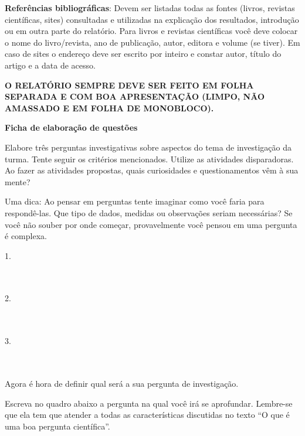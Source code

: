 \noindent\textbf{Referências bibliográficas}: Devem ser listadas todas as fontes (livros, revistas científicas, sites) consultadas e utilizadas na explicação dos resultados, introdução ou em outra parte do relatório. Para livros e revistas científicas você deve colocar o nome do livro/revista, ano de publicação, autor, editora e volume (se tiver). Em caso de sites o endereço deve ser escrito por inteiro e constar autor, título do artigo e a data de acesso.

\noindent\textbf{O RELATÓRIO SEMPRE DEVE SER FEITO EM FOLHA SEPARADA E COM BOA APRESENTAÇÃO (LIMPO, NÃO AMASSADO E EM FOLHA DE MONOBLOCO).}

\cleardoublepage

\label{elaboracao-questoes}
\centering
\textbf{\Large\color{\currentcolor}Ficha de elaboração de questões}
\justify

Elabore três perguntas investigativas sobre aspectos do tema de investigação da turma. Tente seguir os critérios mencionados. Utilize as atividades disparadoras. Ao fazer as atividades propostas, quais curiosidades e questionamentos vêm à sua mente?

Uma dica: Ao pensar em perguntas tente imaginar como você faria para respondê-las. Que tipo de dados, medidas ou observações seriam necessárias? Se você não souber por onde começar, provavelmente você pensou em uma pergunta é complexa.

\setlength\parindent{0em}
\parbox{\linewidth}
{
  1. \hrulefill\\

  \hrulefill\\

  \hrulefill\\
}

\parbox{\linewidth}
{
  2. \hrulefill\\

  \hrulefill\\

  \hrulefill\\
}

\parbox{\linewidth}
{
  3. \hrulefill\\

  \hrulefill\\

  \hrulefill\\
}

Agora é hora de definir qual será a sua pergunta de investigação.

Escreva no quadro abaixo a pergunta na qual você irá se aprofundar. Lembre-se que ela tem que atender a todas as características discutidas no texto “O que é uma boa pergunta científica”.

